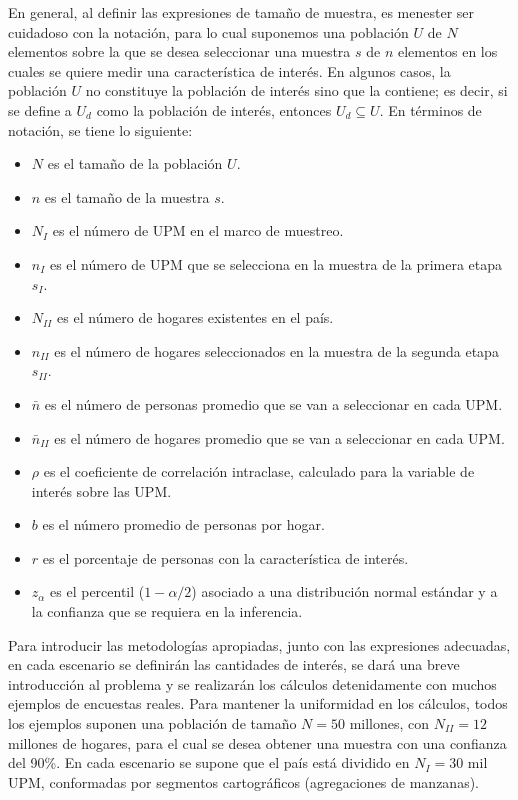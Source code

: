 \documentclass[
  12pt,
  spanish,
]{book}
\providecommand{\tightlist}{%
  \setlength{\itemsep}{0pt}\setlength{\parskip}{0pt}}
\begin{document}
En general, al definir las expresiones de tamaño de muestra, es menester ser cuidadoso con la notación, para lo cual suponemos una población \(U\) de \(N\) elementos sobre la que se desea seleccionar una muestra \(s\) de \(n\) elementos en los cuales se quiere medir una característica de interés. En algunos casos, la población \(U\) no constituye la población de interés sino que la contiene; es decir, si se define a \(U_d\) como la población de interés, entonces \(U_d \subseteq U\). En términos de notación, se tiene lo siguiente:

\begin{itemize}
\tightlist
\item
  \(N\) es el tamaño de la población \(U\).
\item
  \(n\) es el tamaño de la muestra \(s\).
\item
  \(N_{I}\) es el número de UPM en el marco de muestreo.
\item
  \(n_{I}\) es el número de UPM que se selecciona en la muestra de la primera etapa \(s_I\).
\item
  \(N_{II}\) es el número de hogares existentes en el país.
\item
  \(n_{II}\) es el número de hogares seleccionados en la muestra de la segunda etapa \(s_{II}\).
\item
  \(\bar{n}\) es el número de personas promedio que se van a seleccionar en cada UPM.
\item
  \(\bar{n}_{II}\) es el número de hogares promedio que se van a seleccionar en cada UPM.
\item
  \(\rho\) es el coeficiente de correlación intraclase, calculado para la variable de interés sobre las UPM.
\item
  \(b\) es el número promedio de personas por hogar.
\item
  \(r\) es el porcentaje de personas con la característica de interés.
\item
  \(z_{\alpha}\) es el percentil (\(1- \alpha/2\)) asociado a una distribución normal estándar y a la confianza que se requiera en la inferencia.
\end{itemize}

Para introducir las metodologías apropiadas, junto con las expresiones adecuadas, en cada escenario se definirán las cantidades de interés, se dará una breve introducción al problema y se realizarán los cálculos detenidamente con muchos ejemplos de encuestas reales. Para mantener la uniformidad en los cálculos, todos los ejemplos suponen una población de tamaño \(N=50\) millones, con \(N_{II} = 12\) millones de hogares, para el cual se desea obtener una muestra con una confianza del 90\%. En cada escenario se supone que el país está dividido en \(N_{I} =30\) mil UPM, conformadas por segmentos cartográficos (agregaciones de manzanas).
\end{document}
